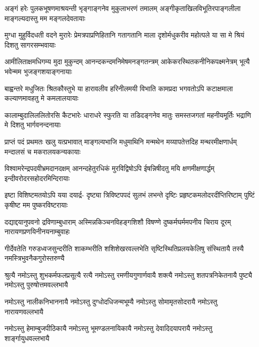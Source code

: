 
\fourlineindentedshloka
{अङ्गं हरेः पुलकभूषणमाश्रयन्ती}
{भृङ्गाङ्गनेव मुकुलाभरणं तमालम्}
{अङ्गीकृताखिलविभूतिरपाङ्गलीला}
{माङ्गल्यदास्तु मम मङ्गलदेवतायाः}

\fourlineindentedshloka
{मुग्धा मुहुर्विदधती वदने मुरारेः}
{प्रेमत्रपाप्रणिहितानि गतागतानि}
{माला दृशोर्मधुकरीव महोत्पले या}
{सा मे श्रियं दिशतु सागरसम्भवायाः}

\fourlineindentedshloka
{आमीलिताक्षमधिगम्य मुदा मुकुन्दम्}
{आनन्दकन्दमनिमेषमनङ्गतन्त्रम्}
{आकेकरस्थितकनीनिकपक्ष्मनेत्रम्}
{भूत्यै भवेन्मम भुजङ्गशयाङ्गनायाः}

\fourlineindentedshloka
{बाह्वन्तरे मधुजितः श्रितकौस्तुभे या}
{हारावलीव हरिनीलमयी विभाति}
{कामप्रदा भगवतोऽपि कटाक्षमाला}
{कल्याणमावहतु मे कमलालयायाः}

\fourlineindentedshloka
{कालाम्बुदालिललितोरसि कैटभारेः}
{धाराधरे स्फुरति या तडिदङ्गनेव}
{मातुः समस्तजगतां महनीयमूर्तिः}
{भद्राणि मे दिशतु भार्गवनन्दनायाः}

\fourlineindentedshloka
{प्राप्तं पदं प्रथमतः खलु यत्प्रभावात्}
{माङ्गल्यभाजि मधुमाथिनि मन्मथेन}
{मय्यापतेत्तदिह मन्थरमीक्षणार्धम्}
{मन्दालसं च मकरालयकन्यकायाः}

\fourlineindentedshloka
{विश्वामरेन्द्रपदवीभ्रमदानदक्षम्}
{आनन्दहेतुरधिकं मुरविद्विषोऽपि}
{ईषन्निषीदतु मयि क्षणमीक्षणार्द्धम्}
{इन्दीवरोदरसहोदरमिन्दिरायाः}

\fourlineindentedshloka
{इष्टा विशिष्टमतयोऽपि यया दयार्द्र-}
{दृष्ट्या त्रिविष्टपपदं सुलभं लभन्ते}
{दृष्टिः प्रहृष्टकमलोदरदीप्तिरिष्टाम्}
{पुष्टिं कृषीष्ट मम पुष्करविष्टरायाः}

\fourlineindentedshloka
{दद्याद्दयानुपवनो द्रविणाम्बुधाराम्}
{अस्मिन्नकिञ्चनविहङ्गशिशौ विषण्णे}
{दुष्कर्मघर्ममपनीय चिराय दूरम्}
{नारायणप्रणयिनीनयनाम्बुवाहः}

\fourlineindentedshloka
{गीर्देवतेति गरुडध्वजसुन्दरीति}
{शाकम्भरीति शशिशेखरवल्लभेति}
{सृष्टिस्थितिप्रलयकेलिषु संस्थितायै}
{तस्यै नमस्त्रिभुवनैकगुरोस्तरुण्यै}

\fourlineindentedshloka
{श्रुत्यै नमोऽस्तु शुभकर्मफलप्रसूत्यै}
{रत्यै नमोऽस्तु रमणीयगुणार्णवायै}
{शक्त्यै नमोऽस्तु शतपत्रनिकेतनायै}
{पुष्ट्यै नमोऽस्तु पुरुषोत्तमवल्लभायै}

\fourlineindentedshloka
{नमोऽस्तु नालीकनिभाननायै}
{नमोऽस्तु दुग्धोदधिजन्मभूम्यै}
{नमोऽस्तु सोमामृतसोदरायै}
{नमोऽस्तु नारायणवल्लभायै}

\fourlineindentedshloka
{नमोऽस्तु हेमाम्बुजपीठिकायै}
{नमोऽस्तु भूमण्डलनायिकायै}
{नमोऽस्तु देवादिदयापरायै}
{नमोऽस्तु शार्ङ्गायुधवल्लभायै}

